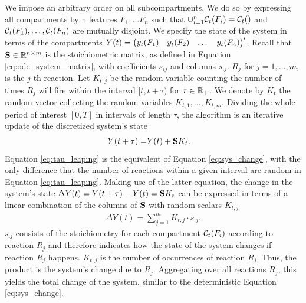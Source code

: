 We impose an arbitrary order on all subcompartments. We do so by expressing all compartments by n features $F_1, \dots F_n$ such that $\cup_{i=1}^n \mathcal{C}_t(F_i) = \mathcal{C}_t()$ and $\mathcal{C}_t(F_1), \dots, \mathcal{C}_t(F_n)$ are mutually disjoint. We specify the state of the system in terms of the compartments $Y(t) = \begin{pmatrix} y_t(F_1) & y_t(F_2) & \dots & y_t(F_n)\end{pmatrix}'$. Recall that $\mathbf{S} \in \mathbb{R}^{n \times m}$ is the stoichiometric matrix, as defined in Equation \eqref{eq:ode_system_matrix}, with coefficients $s_{ij}$ and columns $s_{.j}$. $R_j$ for $j=1, \dots, m$, is the $j$-th reaction. Let $K_{t,j}$ be the random variable counting the number of times $R_j$ will fire within the interval $[t, t + \tau)$ for $\tau \in \mathbb{R}_+$. We denote by $K_t$ the random vector collecting the random variables $K_{t,1}, \hdots, K_{t,m}$. Dividing the whole period of interest $[0, T]$ in intervals of length $\tau$, the algorithm is an iterative update of the discretized system's state
\begin{align}
\label{eq:tau_leaping}
Y(t + \tau) =& Y(t) + \mathbf{S} K_t.
\end{align}
Equation \eqref{eq:tau_leaping} is the equivalent of Equation \eqref{eq:sys_change}, with the only difference that the number of reactions within a given interval are random in Equation \eqref{eq:tau_leaping}. Making use of the latter equation, the change in the system's state $\Delta Y(t) = Y(t + \tau) - Y(t)= \mathbf{S} K_t$ can be expressed in terms of a linear combination of the columns of $\mathbf{S}$ with random scalars $K_{t,j}$
\begin{align}
\Delta Y(t) = \sum_{j=1}^m K_{t,j} \cdot s_{.j}.
\end{align}
$s_{.j}$ consists of the stoichiometry for each compartment $\mathcal{C}_t(F_i)$ according to reaction $R_j$ and therefore indicates how the state of the system changes if reaction $R_j$ happens. $K_{t,j}$ is the number of occurrences of reaction $R_j$. Thus, the product is the system's change due to $R_j$. Aggregating over all reactions $R_j$, this yields the total change of the system, similar to the deterministic Equation \eqref{eq:sys_change}.\\  

